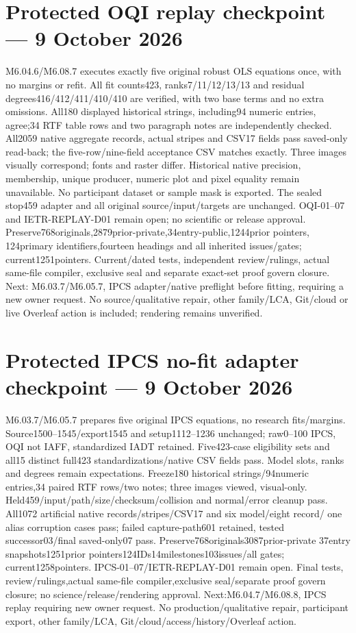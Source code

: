 \documentclass[11pt,a4paper]{article}
\begin{document}
\section*{Protected OQI replay checkpoint --- 9 October 2026}
M6.04.6/M6.08.7 executes exactly five original robust OLS equations once,
with no margins or refit. All fit counts423, ranks7/11/12/13/13 and residual
degrees416/412/411/410/410 are verified, with two base terms and no extra
omissions. All180 displayed historical strings, including94 numeric entries,
agree;34 RTF table rows and two paragraph notes are independently checked.
All2059 native aggregate records, actual stripes and CSV17 fields pass
saved-only read-back; the five-row/nine-field acceptance CSV matches exactly.
Three images visually correspond; fonts and raster differ. Historical
native precision, membership, unique producer, numeric plot and pixel
equality remain unavailable. No participant dataset or sample mask is exported.
The sealed stop459 adapter and all original source/input/targets are unchanged.
OQI-01--07 and IETR-REPLAY-D01 remain open; no scientific or release approval.
Preserve768originals,2879prior-private,34entry-public,1244prior pointers,
124primary identifiers,fourteen headings and all inherited issues/gates;
current1251pointers. Current/dated tests, independent review/rulings, actual
same-file compiler, exclusive seal and separate exact-set proof govern closure.
Next: M6.03.7/M6.05.7, IPCS adapter/native preflight before fitting, requiring
a new owner request. No source/qualitative repair, other family/LCA, Git/cloud
or live Overleaf action is included; rendering remains unverified.

\section*{Protected IPCS no-fit adapter checkpoint --- 9 October 2026}
M6.03.7/M6.05.7 prepares five original IPCS equations, no research fits/margins.
Source1500--1545/export1545 and setup1112--1236 unchanged; raw0--100 IPCS,
OQI not IAFF, standardized IADT retained. Five423-case eligibility sets and
all15 distinct full423 standardizations/native CSV fields pass. Model slots,
ranks and degrees remain expectations. Freeze180 historical strings/94numeric
entries,34 paired RTF rows/two notes; three images viewed, visual-only.
Held459/input/path/size/checksum/collision and normal/error cleanup pass.
All1072 artificial native records/stripes/CSV17 and six model/eight record/
one alias corruption cases pass; failed capture-path601 retained, tested
successor03/final saved-only07 pass. Preserve768originals3087prior-private
37entry snapshots1251prior pointers124IDs14milestones103issues/all gates;
current1258pointers. IPCS-01--07/IETR-REPLAY-D01 remain open. Final tests,
review/rulings,actual same-file compiler,exclusive seal/separate proof govern
closure; no science/release/rendering approval. Next:M6.04.7/M6.08.8,
IPCS replay requiring new owner request. No production/qualitative repair,
participant export, other family/LCA, Git/cloud/access/history/Overleaf action.
\end{document}
